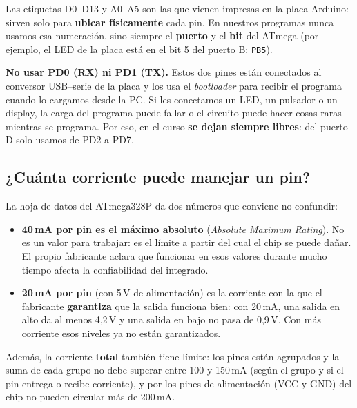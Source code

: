 
Las etiquetas D0--D13 y A0--A5 son las que vienen impresas en la placa Arduino: sirven solo para \textbf{ubicar físicamente} cada pin. En nuestros programas nunca usamos esa numeración, sino siempre el \textbf{puerto} y el \textbf{bit} del ATmega (por ejemplo, el LED de la placa está en el bit 5 del puerto B: \texttt{PB5}).

\begin{advertenciabox}
\textbf{No usar PD0 (RX) ni PD1 (TX).} Estos dos pines están conectados al conversor USB--serie de la placa y los usa el \emph{bootloader} para recibir el programa cuando lo cargamos desde la PC. Si les conectamos un LED, un pulsador o un display, la carga del programa puede fallar o el circuito puede hacer cosas raras mientras se programa. Por eso, en el curso \textbf{se dejan siempre libres}: del puerto D solo usamos de PD2 a PD7.
\end{advertenciabox}

\subsection{¿Cuánta corriente puede manejar un pin?}

La hoja de datos del ATmega328P da dos números que conviene no confundir:

\begin{itemize}
  \item \textbf{40\,mA por pin es el máximo absoluto} (\emph{Absolute Maximum Rating}).
        No es un valor para trabajar: es el límite a partir del cual el chip se puede
        dañar. El propio fabricante aclara que funcionar en esos valores durante mucho
        tiempo afecta la confiabilidad del integrado.
  \item \textbf{20\,mA por pin} (con 5\,V de alimentación) es la corriente con la que el
        fabricante \textbf{garantiza} que la salida funciona bien: con 20\,mA, una salida
        en alto da al menos 4,2\,V y una salida en bajo no pasa de 0,9\,V. Con más
        corriente esos niveles ya no están garantizados.
\end{itemize}

Además, la corriente \textbf{total} también tiene límite: los pines están agrupados y la
suma de cada grupo no debe superar entre 100 y 150\,mA (según el grupo y si el pin
entrega o recibe corriente), y por los pines de alimentación (VCC y GND) del chip no
pueden circular más de 200\,mA.

